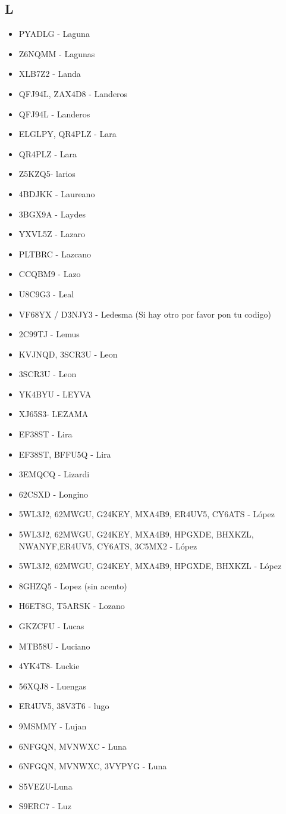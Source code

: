 \subsection*{L}
\begin{itemize}[leftmargin=*,nosep]
\item PYADLG - Laguna
\item Z6NQMM - Lagunas
\item XLB7Z2 - Landa
\item QFJ94L, ZAX4D8 - Landeros
\item QFJ94L - Landeros
\item ELGLPY, QR4PLZ - Lara
\item QR4PLZ  -  Lara
\item Z5KZQ5- larios
\item 4BDJKK - Laureano
\item 3BGX9A - Laydes
\item YXVL5Z  -  Lazaro
\item PLTBRC  - Lazcano
\item CCQBM9 - Lazo
\item U8C9G3 - Leal
\item VF68YX / D3NJY3 - Ledesma (Si hay otro por favor pon tu codigo)
\item 2C99TJ  -  Lemus
\item KVJNQD, 3SCR3U - Leon
\item 3SCR3U - Leon
\item YK4BYU - LEYVA
\item XJ65S3- LEZAMA
\item EF38ST - Lira
\item EF38ST, BFFU5Q - Lira
\item 3EMQCQ - Lizardi
\item 62CSXD  -  Longino
\item 5WL3J2, 62MWGU, G24KEY, MXA4B9, ER4UV5, CY6ATS - López
\item 5WL3J2, 62MWGU, G24KEY, MXA4B9, HPGXDE, BHXKZL, NWANYF,ER4UV5, CY6ATS, 3C5MX2 - López
\item 5WL3J2, 62MWGU, G24KEY, MXA4B9, HPGXDE, BHXKZL -  López
\item 8GHZQ5 - Lopez (sin acento)
\item H6ET8G, T5ARSK  -  Lozano
\item GKZCFU - Lucas
\item MTB58U - Luciano
\item 4YK4T8- Luckie
\item 56XQJ8 - Luengas
\item ER4UV5, 38V3T6 - lugo
\item 9MSMMY - Lujan
\item 6NFGQN, MVNWXC - Luna
\item 6NFGQN, MVNWXC, 3VYPYG - Luna
\item S5VEZU-Luna
\item S9ERC7 - Luz
\end{itemize}

